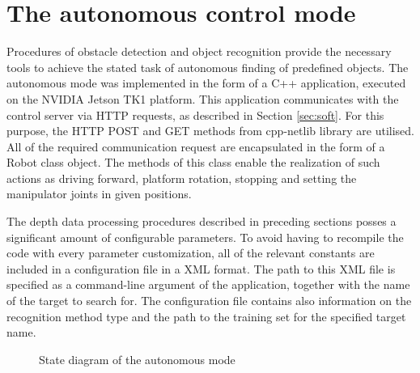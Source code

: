 
\section{The autonomous control mode}
\label{sec:autonomy}

Procedures of obstacle detection and object recognition provide the necessary tools to achieve the stated task of autonomous finding of predefined objects. The autonomous mode was implemented in the form of a C++ application, executed on the NVIDIA Jetson TK1 platform. This application communicates with the control server via HTTP requests, as described in Section \ref{sec:soft}. For this purpose, the HTTP POST and GET methods from cpp-netlib \cite{netlib} library are utilised. All of the required communication request are encapsulated in the form of a Robot class object. The methods of this class enable the realization of such actions as driving forward, platform rotation, stopping and setting the manipulator joints in given positions. 

The depth data processing procedures described in preceding sections posses a significant amount of configurable parameters. To avoid having to recompile the code with every parameter customization, all of the relevant constants are included in a configuration file in a XML format. The path to this XML file is specified as a command-line argument of the application, together with the name of  the target to search for. The configuration file contains also information on the recognition method type and the path to the training set for the specified target name.

\begin{figure}[H]
\begin{centering}


\caption{State diagram of the autonomous mode}
\label{fig:statetrans}

\end{centering}
\end{figure}

